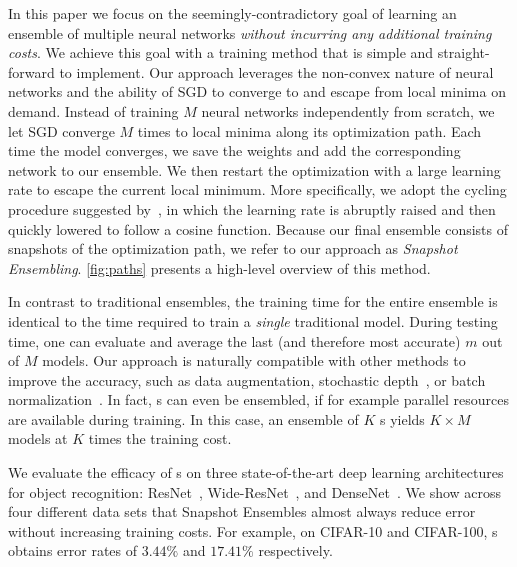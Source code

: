 In this paper we focus on the seemingly-contradictory goal of learning an ensemble of multiple neural networks \emph{without incurring any additional training costs}.
We achieve this goal with a training method that is simple and straight-forward to implement. 
Our approach leverages the non-convex nature of neural networks and the ability of SGD to converge to and escape from local minima on demand.  Instead of training $M$ neural networks independently from scratch, we let SGD converge $M$ times to local minima along its optimization path.
Each time the model converges, we save the weights and add the corresponding network to our ensemble. We then restart the optimization with a large learning rate to escape the current local minimum. More specifically, we adopt the cycling procedure suggested by~\cite{loshchilov2016sgdr}, in which the learning rate is abruptly raised and then quickly lowered to follow a cosine function.
Because our final ensemble consists of snapshots of the optimization path, we refer to our approach as \emph{Snapshot Ensembling}. \autoref{fig:paths} presents a high-level overview of this method.

In contrast to traditional ensembles, the training time for the entire ensemble is identical to the time required to train a \emph{single} traditional model.  During testing time, one can  evaluate and average the last (and therefore most accurate) $m$ out of $M$ models. Our approach is naturally compatible with other methods to improve the accuracy, such as data augmentation,  stochastic depth~\citep{stochastic}, or  batch normalization~\citep{batch-norm}.  In fact, \name{}s  can even be ensembled, if for example parallel resources are available during training.  In this case, an ensemble of $K$ \name{}s  yields $K\times M$  models at $K$ times the training cost.

We evaluate the efficacy of \name{}s on three state-of-the-art deep learning architectures for object recognition: ResNet~\citep{he2016identity}, Wide-ResNet~\citep{wide}, and DenseNet~\citep{huang2016densely}.  We show across four different data sets that Snapshot Ensembles almost always reduce error without increasing training costs. For example, on CIFAR-10 and CIFAR-100, \name{}s obtains error rates of $3.44\%$ and $17.41\%$ respectively.

